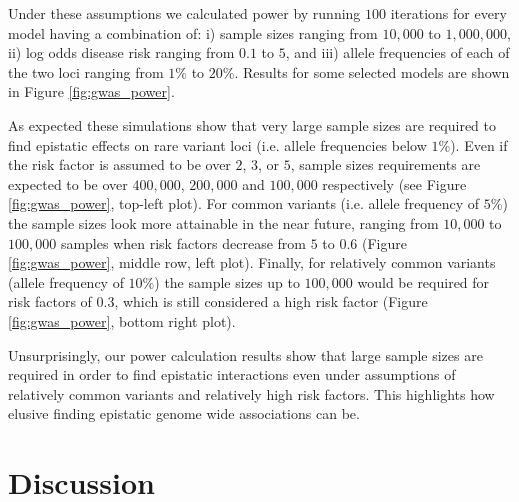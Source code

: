 Under these assumptions we calculated power by running $100$ iterations for every model having a combination of: 
i) sample sizes ranging from $10,000$ to $1,000,000$,
ii) log odds disease risk ranging from $0.1$ to $5$,
and 
iii) allele frequencies of each of the two loci ranging from $1\%$ to $20\%$.
Results for some selected models are shown in Figure \ref{fig:gwas_power}.


As expected these simulations show that very large sample sizes are required to find epistatic effects on rare variant loci (i.e. allele frequencies below $1\%$).
Even if the risk factor is assumed to be over $2$, $3$, or $5$, sample sizes requirements are expected to be over $400,000$, $200,000$ and $100,000$ respectively (see Figure \ref{fig:gwas_power}, top-left plot).
For common variants (i.e. allele frequency of $5\%$) the sample sizes look more attainable in the near future, ranging from $10,000$ to $100,000$ samples when risk factors decrease from $5$ to $0.6$ (Figure \ref{fig:gwas_power}, middle row, left plot).
Finally, for relatively common variants (allele frequency of $10\%$) the sample sizes up to $100,000$ would be required for risk factors of $0.3$, which is still considered a high risk factor (Figure \ref{fig:gwas_power}, bottom right plot).

Unsurprisingly, our power calculation results show that large sample sizes are required in order to find epistatic interactions even under assumptions of relatively common variants and relatively high risk factors.
This highlights how elusive finding epistatic genome wide associations can be.

\section{Discussion}

